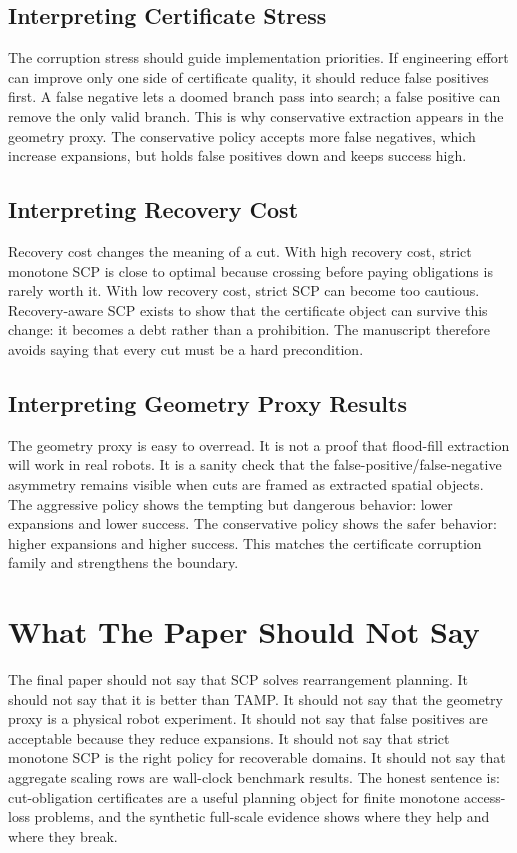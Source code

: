 \documentclass{article}
\begin{document}
\subsection{Interpreting Certificate Stress}

The corruption stress should guide implementation priorities. If engineering effort can improve only one side of certificate quality, it should reduce false positives first. A false negative lets a doomed branch pass into search; a false positive can remove the only valid branch. This is why conservative extraction appears in the geometry proxy. The conservative policy accepts more false negatives, which increase expansions, but holds false positives down and keeps success high.

\subsection{Interpreting Recovery Cost}

Recovery cost changes the meaning of a cut. With high recovery cost, strict monotone SCP is close to optimal because crossing before paying obligations is rarely worth it. With low recovery cost, strict SCP can become too cautious. Recovery-aware SCP exists to show that the certificate object can survive this change: it becomes a debt rather than a prohibition. The manuscript therefore avoids saying that every cut must be a hard precondition.

\subsection{Interpreting Geometry Proxy Results}

The geometry proxy is easy to overread. It is not a proof that flood-fill extraction will work in real robots. It is a sanity check that the false-positive/false-negative asymmetry remains visible when cuts are framed as extracted spatial objects. The aggressive policy shows the tempting but dangerous behavior: lower expansions and lower success. The conservative policy shows the safer behavior: higher expansions and higher success. This matches the certificate corruption family and strengthens the boundary.

\section{What The Paper Should Not Say}

The final paper should not say that SCP solves rearrangement planning. It should not say that it is better than TAMP. It should not say that the geometry proxy is a physical robot experiment. It should not say that false positives are acceptable because they reduce expansions. It should not say that strict monotone SCP is the right policy for recoverable domains. It should not say that aggregate scaling rows are wall-clock benchmark results. The honest sentence is: cut-obligation certificates are a useful planning object for finite monotone access-loss problems, and the synthetic full-scale evidence shows where they help and where they break.
\end{document}
